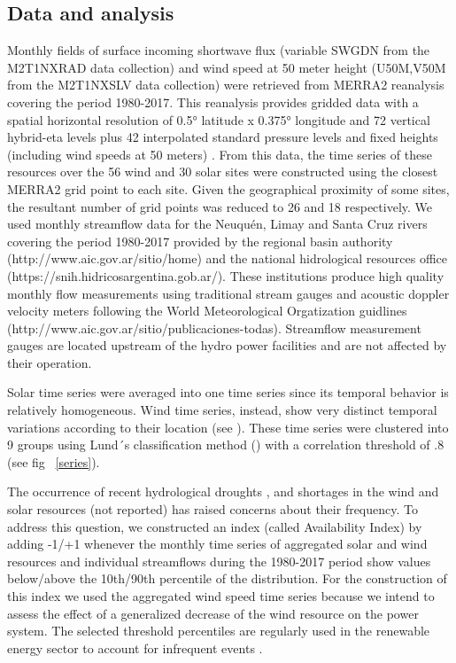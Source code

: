 \documentclass[AMA,Times1COL]{WileyNJDv5} %
\begin{document}
\begin{linenumbers}
\subsection{Data and analysis}

Monthly fields of surface incoming shortwave flux (variable SWGDN from the M2T1NXRAD data collection) and wind speed at 50 meter height (U50M,V50M from the M2T1NXSLV data collection) were retrieved from MERRA2 reanalysis \cite{} covering the period 1980-2017. This reanalysis provides gridded data with a spatial horizontal resolution of 0.5° latitude x 0.375° longitude and 72 vertical hybrid-eta levels plus 42 interpolated standard pressure levels and fixed heights (including wind speeds at 50 meters) \cite{bosilovich2015merra, gelaro2017modern}. From this data, the time series of these resources over the 56 wind and 30 solar sites were constructed using the closest MERRA2 grid point to each site. Given the geographical proximity of some sites, the resultant number of grid points was reduced to 26 and 18 respectively. We used monthly streamflow data for the Neuquén, Limay and Santa Cruz rivers covering the period 1980-2017 provided by the regional basin authority (http://www.aic.gov.ar/sitio/home) and the national hidrological resources office (https://snih.hidricosargentina.gob.ar/). These institutions produce high quality monthly flow measurements using traditional stream gauges and acoustic doppler velocity meters following the World Meteorological Orgatization guidlines (http://www.aic.gov.ar/sitio/publicaciones-todas). Streamflow measurement gauges are located upstream of the hydro power facilities and are not affected by their operation.

Solar time series were averaged into one time series since its temporal behavior is relatively homogeneous. Wind time series, instead, show very distinct temporal variations according to their location (see \cite{bianchi2019spatiotemporal}). These time series were clustered into 9 groups using Lund´s classification method (\cite{lund1963map}) with a correlation threshold of .8 (see fig ~\ref{series}).

The occurrence of recent hydrological droughts \cite{aguayo2021hydrological}, and shortages in the wind and solar resources (not reported) has raised concerns about their frequency. To address this question, we constructed an index (called Availability Index) by adding -1/+1 whenever the monthly time series of aggregated solar and wind resources and individual streamflows during the 1980-2017 period show values below/above the 10th/90th percentile of the distribution. For the construction of this index we used the aggregated wind speed time series because we intend to assess the effect of a generalized decrease of the wind resource on the power system. The selected threshold percentiles are regularly used in the renewable energy sector to account for infrequent events \cite{dobos2012p50, pryor2018interannual, aytac2024environmental}.


\end{linenumbers}
\end{document}
